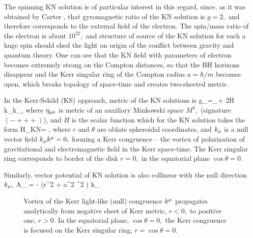 \documentclass[aps,prd,twocolumn,showpacs]{revtex4}
\begin{document}
 The spinning KN  solution is of particular interest in this regard, since, as it was obtained
 by Carter \cite{DKS,Car}, that gyromagnetic ratio of the KN solution is $g=2 ,$  and therefore
 corresponds to the external field of the electron. The spin/mass ratio of
 the electron is about $10^{22} ,$ and structure of source of the
 KN solution for such a huge spin  should shed the light on origin of
 the conflict between gravity and quantum theory. One can see that
 the KN field with parameters of electron becomes extremely strong  on
 the Compton distances, so that  the BH horizons disappear and the  Kerr singular
 ring of the Compton radius  $a = \hbar/m $ becomes open, which  breaks topology of space-time
 and creates two-sheeted metric.

 \noindent In the Kerr-Schild (KS) approach, metric of the KN solutions is \cite{DKS}
\be g_\mn =\eta_\mn + 2H k_\m k_\n , \label{KS}\ee where $ \eta_{\mu\nu} $ is metric of an auxiliary
Minkowski space $M^4 ,$ (signature $(- + + +)$),
and $H$ is the scalar function which for the KN solution takes the form
 \be H_{KN}= ,\label{HKN} \ee where
 $r$ and $\theta$ are oblate spheroidal coordinates, and $ k_\mu $ is a null vector
field $ k_\mu k^\mu =0 ,$ forming a Kerr congruence -- the vortex of polarization of gravitational and electromagnetic field in the Kerr space-time.  The Kerr singular ring corresponds to border of the disk $r=0 , $ in the equatorial plane $\cos\theta =0 .$

Similarly, vector potential of KN solution is also collinear with the null direction $k_\mu ,$
  \be A_{\m} = -  { (r^2 + a^2 \cos^2 \theta)} k_\m
\label{Amuk}  \ee

\begin{figure}[ht]
\centerline{}
\caption{Vortex of the Kerr light-like (null) congruence $k^\mu$  propagates analytically from negative sheet of Kerr metric,
$r<0 ,$ to positive one, $r>0 $. In the equatorial plane, $\cos\theta=0 ,$  the Kerr congruence is
focused on the Kerr singular ring, $r=\cos\theta=0 $.}
\end{figure}
\end{document}
